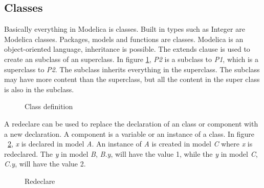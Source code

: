 \documentclass{cslthse-msc}
\begin{document}
\subsection{Classes}
Basically everything in Modelica is classes. Built in types such as Integer are Modelica classes. Packages, models and functions are classes. Modelica is an object-oriented language, inheritance is possible. The extends clause is used to create an subclass of an superclass. In figure \ref{fig:classDefinition}, \textit{P2} is a subclass to \textit{P1}, which is a superclass to \textit{P2}. The subclass inherits everything in the superclass. The subclass may have more content than the superclass, but all the content in the super class is also in the subclass. 

\begin{figure}[H]
    \centering
    \subfloat{{}}
    \caption{Class definition}
    \label{fig:classDefinition}
\end{figure}

A redeclare can be used to replace the declaration of an class or component with a new declaration. A component is a variable or an instance of a class. In figure ~\ref{fig:redeclare}, \textit{x} is declared in model \textit{A}. An instance of \textit{A} is created in model \textit{C} where \textit{x} is redeclared. The \textit{y} in model \textit{B}, \textit{B.y}, will have the value 1, while the \textit{y} in model \textit{C}, \textit{C.y}, will have the value 2.

\begin{figure}[H]
	
    \caption{Redeclare}
    \label{fig:redeclare}
\end{figure}
\end{document}
